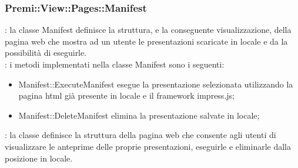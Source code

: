 {		\subsubsection{Premi::View::Pages::Manifest}{
			\textbf{\tipo}: la classe Manifest definisce la struttura, e la conseguente visualizzazione, della pagina web che mostra ad un utente le presentazioni scaricate in locale e da la possibilità di eseguirle.\\
			\textbf{\interfacce}: i metodi implementati nella classe Manifest sono i seguenti:
			\begin{itemize}
				\item Manifest::ExecuteManifest esegue la presentazione selezionata utilizzando la pagina html già presente in locale e il framework impress.js;
				\item Manifest::DeleteManifest elimina la presentazione salvate in locale;
			\end{itemize} 
			\textbf{\attivita}: la classe definisce la struttura della pagina web che consente agli utenti di visualizzare le anteprime delle proprie presentazioni, eseguirle e eliminarle dalla posizione in locale.\\\\
		}
}
